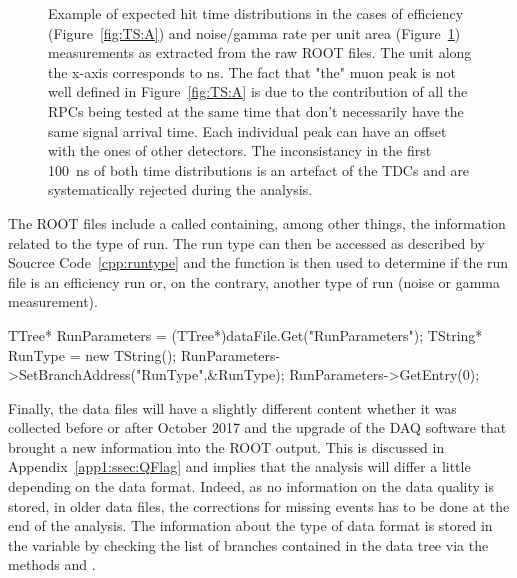 \begin{figure}[H]
\begin{subfigure}{0.5\linewidth}
			\caption{\label{fig:TS:B}}
		\end{subfigure}
		\caption{\label{fig:TS} Example of expected hit time distributions in the cases of efficiency (Figure~\ref{fig:TS:A}) and noise/gamma rate per unit area (Figure~\ref{fig:TS:B}) measurements as extracted from the raw ROOT files. The unit along the x-axis corresponds to \si{ns}. The fact that "the" muon peak is not well defined in Figure~\ref{fig:TS:A} is due to the contribution of all the RPCs being tested at the same time that don't necessarily have the same signal arrival time. Each individual peak can have an offset with the ones of other detectors. The inconsistancy in the first \SI{100}{ns} of both time distributions is an artefact of the TDCs and are systematically rejected during the analysis.}
	\end{figure}
	
	The ROOT files include a  called  containing, among other things, the information related to the type of run. The run type can then be accessed as described by Soucrce Code~\ref{cpp:runtype} and the function  is then used to determine if the run file is an efficiency run or, on the contrary, another type of run (noise or gamma measurement).\\
	
	\begin{code}
	\begin{cppcode}
TTree* RunParameters = (TTree*)dataFile.Get("RunParameters");
TString* RunType = new TString();
RunParameters->SetBranchAddress("RunType",&RunType);
RunParameters->GetEntry(0);
	\end{cppcode}
	\label{cpp:runtype}
	\vspace{5mm}
	\end{code}
	
	Finally, the data files will have a slightly different content whether it was collected before or after October 2017 and the upgrade of the DAQ software that brought a new information into the ROOT output. This is discussed in Appendix~\ref{app1:ssec:QFlag} and implies that the analysis will differ a little depending on the data format. Indeed, as no information on the data quality is stored, in older data files, the corrections for missing events has to be done at the end of the analysis. The information about the type of data format is stored in the variable  by checking the list of branches contained in the data tree via the methods  and .
	
